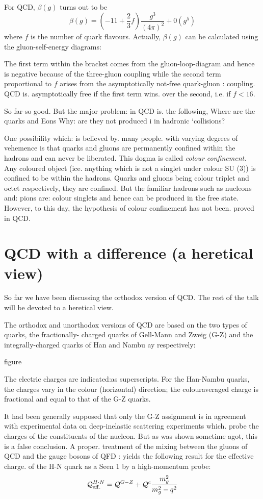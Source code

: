 For QCD, $\beta (g)$ turns out to be 
$$
\beta(g) = \left(-11 + \frac{2}{3} f \right) \frac{g^{3}}{(4 \pi)^{2}} + 0(g^{5})
$$
where $f$ is the number of quark flavours.  Actually, $\beta(g)$ can be calculated using the gluon-self-energy diagrams: 


The first term within the bracket comes from the gluon-loop-diagram and hence is negative because of the three-gluon coupling while the second 
term proportional to $f$ arises from the asymptotically not-free quark-gluon :
coupling. QCD is. asymptotically free if the first term wins. over the
second, i.e. if $f < 16$.  

So far-so good. But the major problem: in QCD is. the following,
Where are the quarks and Eons Why: are they not produced i in hadronic
‘collisions?

One possibility which: is  believed by. many people. with varying degrees
of vehemence is that quarks and gluons are permanently confined within
the hadrons and can never be liberated. This dogma is called {\it colour
confinement}. Any coloured object (ice. anything which is not a singlet
under colour SU (3)) is confined to be within the hadrons.  Quarks and
gluons being colour triplet and octet respectively, they are confined. But
the familiar hadrons such as nucleons and: pions are: colour singlets and
hence can be produced in the free state. However, to this day, the hypothesis of colour confinement has not been. proved in QCD. 

\section{QCD with a difference (a heretical view)}

So far we have been discussing the orthodox version of QCD. The rest
of the talk will be devoted to a heretical view. 

The orthodox and unorthodox versions of QCD are based on the two
types of quarks, the fractionally- charged quarks of Gell-Mann and Zweig
(G-Z) and the integrally-charged quarks of Han and Nambu ay
respectively: 

figure

The electric charges are indicated:as superscripts. For the Han-Nambu
quarks, the charges vary in the colour (horizontal) direction; the colouraveraged charge is fractional and equal to that of the G-Z quarks. 


It had been generally supposed that only the G-Z assignment is in
agreement with experimental data on deep-inelastic scattering experiments
which. probe the charges of the constituents of the nucleon. But as was 
shown sometime agot, this is a false conclusion. A proper. treatment of 
the mixing between the gluons of QCD and the gauge bosons of QFD
: yields the following result for the effective charge. of the H-N quark as a
Seen 1 by a high-momentum probe: 
$$
\mathcal{Q}^{H \cdot N}_{{\rm eff.}} = \mathcal{Q}^{G-Z} + \mathcal{Q}^{c} \frac{m^{2}_{g}}{m^{2}_{g}-q^{2}}
$$

